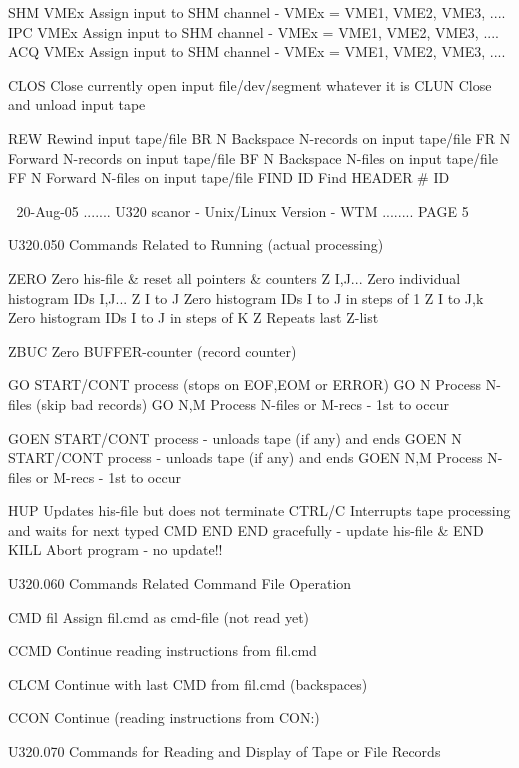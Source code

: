    SHM  VMEx  Assign input to SHM channel - VMEx = VME1, VME2, VME3, ....
   IPC  VMEx  Assign input to SHM channel - VMEx = VME1, VME2, VME3, ....
   ACQ  VMEx  Assign input to SHM channel - VMEx = VME1, VME2, VME3, ....
 
   CLOS       Close currently open input file/dev/segment whatever it is
   CLUN       Close and unload input tape
 
   REW        Rewind input tape/file
   BR   N     Backspace N-records on input tape/file
   FR   N     Forward   N-records on input tape/file
   BF   N     Backspace N-files   on input tape/file
   FF   N     Forward   N-files   on input tape/file
   FIND ID    Find HEADER # ID
 
    
   20-Aug-05 ....... U320  scanor - Unix/Linux Version - WTM ........ PAGE   5
 
 
   U320.050  Commands Related to Running (actual processing)
 
   ZERO       Zero his-file & reset all pointers & counters
   Z I,J...   Zero individual histogram IDs I,J...
   Z I to J   Zero histogram IDs I to J in steps of 1
   Z I to J,k Zero histogram IDs I to J in steps of K
   Z          Repeats last Z-list
 
   ZBUC       Zero BUFFER-counter (record counter)
 
   GO         START/CONT process (stops on EOF,EOM or ERROR)
   GO   N     Process N-files (skip bad records)
   GO   N,M   Process N-files or M-recs - 1st to occur
 
   GOEN       START/CONT process - unloads tape (if any) and ends
   GOEN N     START/CONT process - unloads tape (if any) and ends
   GOEN N,M   Process N-files or M-recs - 1st to occur
 
   HUP        Updates his-file but does not terminate
   CTRL/C     Interrupts tape processing and waits for next typed CMD
   END        END gracefully - update his-file & END
   KILL       Abort program  - no update!!
 
 
   U320.060  Commands Related Command File Operation
 
   CMD  fil   Assign fil.cmd as cmd-file (not read yet)
 
   CCMD       Continue reading instructions from fil.cmd
 
   CLCM       Continue with last CMD from fil.cmd (backspaces)
 
   CCON       Continue (reading instructions from CON:)
 
 
   U320.070  Commands for Reading and Display of Tape or File Records
 
